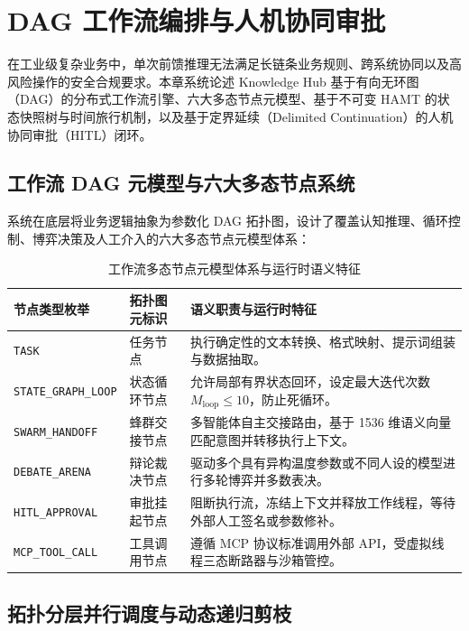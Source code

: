 
\chapter{DAG 工作流编排与人机协同审批}

在工业级复杂业务中，单次前馈推理无法满足长链条业务规则、跨系统协同以及高风险操作的安全合规要求。本章系统论述 Knowledge Hub 基于有向无环图（DAG）的分布式工作流引擎、六大多态节点元模型、基于不可变 HAMT 的状态快照树与时间旅行机制，以及基于定界延续（Delimited Continuation）的人机协同审批（HITL）闭环。

\section{工作流 DAG 元模型与六大多态节点系统}

系统在底层将业务逻辑抽象为参数化 DAG 拓扑图，设计了覆盖认知推理、循环控制、博弈决策及人工介入的六大多态节点元模型体系：

\begin{table}[htbp]
\centering
\small
\caption{工作流多态节点元模型体系与运行时语义特征}
\label{tab:dag_node_types}
\begin{tabularx}{\textwidth}{p{4.0cm}lX}
\toprule
\textbf{节点类型枚举} & \textbf{拓扑图元标识} & \textbf{语义职责与运行时特征} \\
\midrule
\texttt{TASK} & 任务节点 & 执行确定性的文本转换、格式映射、提示词组装与数据抽取。 \\
\texttt{STATE\_GRAPH\_LOOP} & 状态循环节点 & 允许局部有界状态回环，设定最大迭代次数 $M_{\text{loop}} \le 10$，防止死循环。 \\
\texttt{SWARM\_HANDOFF} & 蜂群交接节点 & 多智能体自主交接路由，基于 1536 维语义向量匹配意图并转移执行上下文。 \\
\texttt{DEBATE\_ARENA} & 辩论裁决节点 & 驱动多个具有异构温度参数或不同人设的模型进行多轮博弈并多数表决。 \\
\texttt{HITL\_APPROVAL} & 审批挂起节点 & 阻断执行流，冻结上下文并释放工作线程，等待外部人工签名或参数修补。 \\
\texttt{MCP\_TOOL\_CALL} & 工具调用节点 & 遵循 MCP 协议标准调用外部 API，受虚拟线程三态断路器与沙箱管控。 \\
\bottomrule
\end{tabularx}
\end{table}

\section{拓扑分层并行调度与动态递归剪枝}

